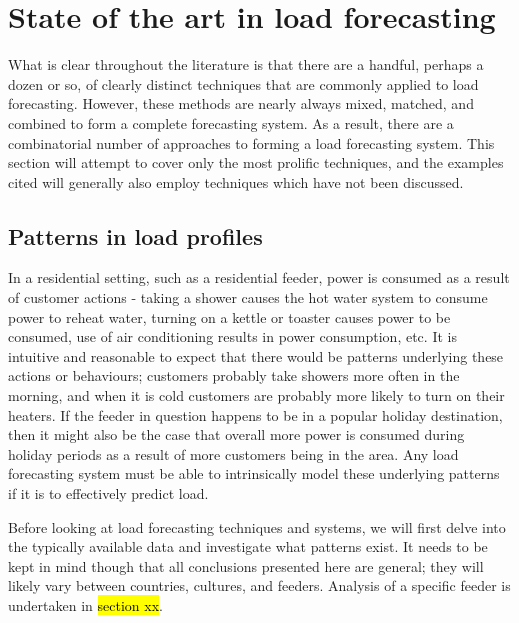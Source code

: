 \section{State of the art in load forecasting}
What is clear throughout the literature is that there are a handful, perhaps a dozen or so, of clearly distinct techniques that are commonly applied to load forecasting.
However, these methods are nearly always mixed, matched, and combined to form a complete forecasting system.
As a result, there are a combinatorial number of approaches to forming a load forecasting system.
This section will attempt to cover only the most prolific techniques, and the examples cited will generally also employ techniques which have not been discussed. 

\subsection{Patterns in load profiles}
\label{pattens-profiles}
In a residential setting, such as a residential feeder, power is consumed as a result of customer actions - taking a shower causes the hot water system to consume power to reheat water, turning on a kettle or toaster causes power to be consumed, use of air conditioning results in power consumption, etc.
It is intuitive and reasonable to expect that there would be patterns underlying these actions or behaviours; customers probably take showers more often in the morning, and when it is cold customers are probably more likely to turn on their heaters.
If the feeder in question happens to be in a popular holiday destination, then it might also be the case that overall more power is consumed during holiday periods as a result of more customers being in the area.
Any load forecasting system must be able to intrinsically model these underlying patterns if it is to effectively predict load.
\par
Before looking at load forecasting techniques and systems, we will first delve into the typically available data and investigate what patterns exist.
It needs to be kept in mind though that all conclusions presented here are general; they will likely vary between countries, cultures, and feeders.
Analysis of a specific feeder is undertaken in \hl{section xx}.

